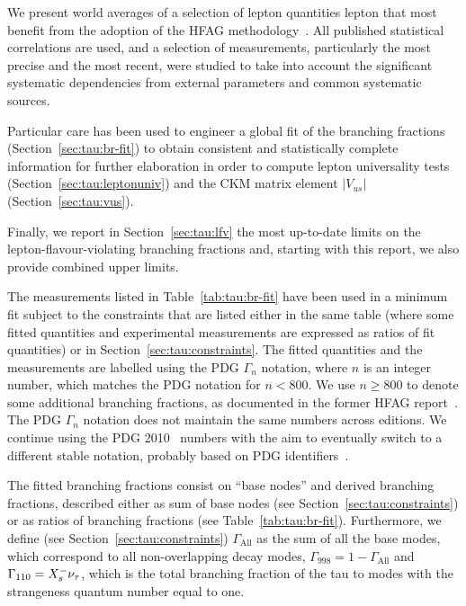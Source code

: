 We present world averages of a selection of \mtau lepton quantities lepton
that most benefit from the adoption of the HFAG
methodology~\cite{Amhis:2012bh}.
All published statistical correlations are used, and a
selection of measurements, particularly the most precise and the most
recent, were studied to take into account the significant systematic
dependencies from external parameters and common systematic sources.

Particular care has been used to engineer a global fit of the \mtau
branching fractions (Section~\ref{sec:tau:br-fit}) to obtain consistent
and statistically complete information for further elaboration in order to
compute lepton universality tests (Section~\ref{sec:tau:leptonuniv}) and
the CKM matrix element $|V_{us}|$ (Section~\ref{sec:tau:vus}).

Finally, we report in Section~\ref{sec:tau:lfv} the most up-to-date limits
on the lepton-flavour-violating \mtau branching fractions and, starting with
this report, we also provide combined upper limits.

\label{sec:tau:br-fit}

The measurements listed in Table~\ref{tab:tau:br-fit} have been used in a
minimum \chisq fit subject to the constraints that are listed
either in the same table (where some fitted quantities and experimental
measurements are expressed as ratios of fit quantities) or in
Section~\ref{sec:tau:constraints}. The fitted quantities and the measurements
are labelled using the PDG $\Gamma_{n}$ notation, where $n$ is
an integer number, which matches the PDG notation for $n<800$. We use
$n\ge 800$ to denote some additional branching fractions, as documented in the
former HFAG report~\cite{Amhis:2012bh}. The PDG $\Gamma_{n}$ notation does
not maintain the same numbers across editions. We continue using the PDG
2010~\cite{PDG_2010} numbers with the aim to eventually switch to a different stable notation,
probably based on PDG identifiers~\cite{pdg-identifiers-2014}.

The fitted branching fractions consist on  ``base nodes'' and  derived
branching fractions, described either as sum of base nodes (see
Section~\ref{sec:tau:constraints}) or as ratios of branching fractions (see
Table~\ref{tab:tau:br-fit}). Furthermore, we define (see
Section~\ref{sec:tau:constraints}) $\Gamma_{\text{All}}$ as the sum of all
the base modes, which correspond to all non-overlapping \mtau decay modes,
$\Gamma_{998} = 1 -\Gamma_{\text{All}}$ and $\Gamma_{110} =
\BRF{\tau^-}{X_s^- \nu_\tau}$, which is the total branching fraction of the
tau to modes with the strangeness quantum number equal to one.

